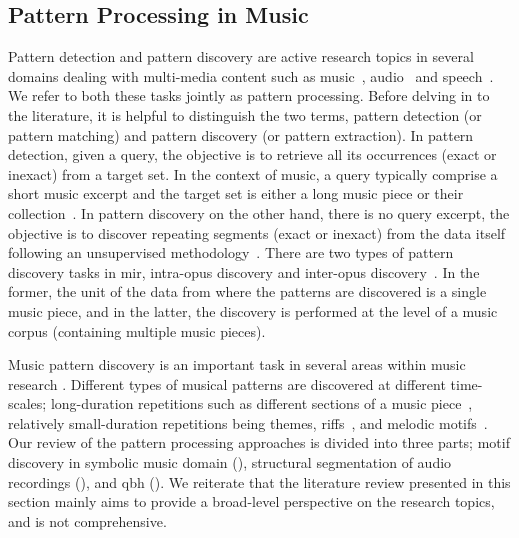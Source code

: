 \subsection{Pattern Processing in Music}
\label{sec:pattern_processin_in_music}

Pattern detection and pattern discovery are active research topics in several domains dealing with multi-media content such as music~\citep{klapuri2010pattern}, audio~\citep{Herley2006} and speech~\citep{Park2008}. We refer to both these tasks jointly as pattern processing. Before delving in to the literature, it is helpful to distinguish the two terms, pattern detection (or pattern matching) and pattern discovery (or pattern extraction). In pattern detection, given a query, the objective is to retrieve all its occurrences (exact or inexact) from a target set. In the context of music, a query typically comprise a short music excerpt and the target set is either a long music piece or their collection~\citep{ghias1995query}. In pattern discovery on the other hand, there is no query excerpt, the objective is to discover repeating segments (exact or inexact) from the data itself following an unsupervised methodology~\citep{dannenberg2003pattern}. There are two types of pattern discovery tasks in \gls{mir}, intra-opus discovery and inter-opus discovery~\citep{conklin2001representation}. In the former,\textsl{} the unit of the data from where the patterns are discovered is a single music piece, and in the latter, the discovery is performed at the level of a music corpus (containing multiple music pieces).

Music pattern discovery is an important task in several areas within music research \citep{collins2011modeling,Conklin2010a,serra2014unsupervised,nieto2012compressing}. Different types of musical patterns are discovered at different time-scales; long-duration repetitions such as different sections of a music piece~\citep{serra2012unsupervised,Goto06TASLP}, relatively small-duration repetitions being themes, riffs~\citep{Hsu2001a}, and melodic motifs~\citep{collins2011improved}. Our review of the pattern processing approaches is divided into three parts; motif discovery in symbolic music domain (), structural segmentation of audio recordings (), and \gls{qbh} (). We reiterate that the literature review presented in this section mainly aims to provide a broad-level perspective on the research topics, and is not comprehensive.

